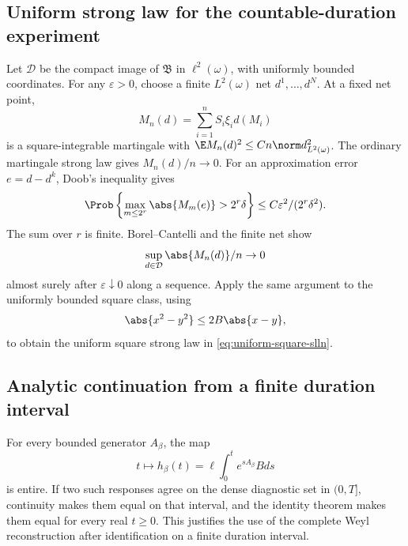 \subsection{Uniform strong law for the countable-duration experiment}

Let \(\mathcal D\) be the compact image of \(\mathfrak B\) in
\(\ell^2(\omega)\), with uniformly bounded coordinates.  For any
\(\varepsilon>0\), choose a finite \(L^2(\omega)\) net
\(d^1,\ldots,d^N\).  At a fixed net point,
\[
 M_n(d)=\sum_{i=1}^nS_i\xi_id(M_i)
\]
is a square-integrable martingale with
\(\E M_n(d)^2\le Cn\norm d_{L^2(\omega)}^2\).  The ordinary martingale strong
law gives \(M_n(d)/n\to0\).  For an approximation error \(e=d-d^k\), Doob's
inequality gives
\[
 \Prob\left\{\max_{m\le2^r}\abs{M_m(e)}>2^r\delta\right\}
 \le C\varepsilon^2/(2^r\delta^2).
\]
The sum over \(r\) is finite.  Borel--Cantelli and the finite net show
\[
 \sup_{d\in\mathcal D}\abs{M_n(d)}/n\to0
\]
almost surely after \(\varepsilon\downarrow0\) along a sequence.  Apply the
same argument to the uniformly bounded square class, using
\[
 \abs{x^2-y^2}\le2B\abs{x-y},
\]
to obtain the uniform square strong law in
\eqref{eq:uniform-square-slln}.

\subsection{Analytic continuation from a finite duration interval}

For every bounded generator \(A_\beta\), the map
\[
 t\mapsto h_\beta(t)=\ell\int_0^te^{sA_\beta}Bds
\]
is entire.  If two such responses agree on the dense diagnostic set in
\((0,T]\), continuity makes them equal on that interval, and the identity
theorem makes them equal for every real \(t\ge0\).  This justifies the use of
the complete Weyl reconstruction after identification on a finite duration
interval.
